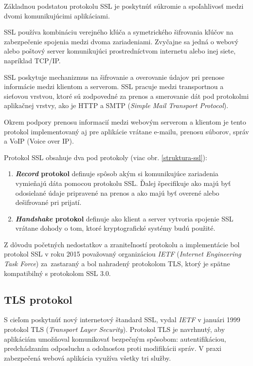 Základnou podstatou protokolu SSL je poskytnúť súkromie a spoľahlivosť medzi dvomi komunikujúcimi aplikáciami.

SSL používa kombináciu verejného kľúča a symetrického šifrovania kľúčov na zabezpečenie spojenia medzi dvoma zariadeniami. Zvyčajne sa jedná o webový alebo poštový server komunikujúci prostredníctvom internetu alebo inej siete, napríklad TCP/IP.

SSL poskytuje mechanizmus na šifrovanie a overovanie údajov pri prenose informácie medzi klientom a serverom. SSL pracuje medzi transportnou a sieťovou vrstvou, ktoré sú zodpovedné za prenos a smerovanie dát pod protokolmi aplikačnej vrstvy, ako je HTTP a SMTP (\emph{Simple Mail Transport Protocol}).

Okrem podpory prenosu informacií medzi webovým serverom a klientom je tento protokol implementovaný aj pre aplikácie vrátane e-mailu, prenosu súborov, správ a VoIP (Voice over IP).

Protokol SSL obsahuje dva pod protokoly (viac obr. \ref{struktura-ssl}):
\begin{enumerate}

\item \textbf{\emph{Record} protokol} definuje spôsob akým si komunikujúce zariadenia vymieňajú dáta pomocou protokolu SSL. Ďalej špecifikuje ako majú byť odosielané údaje pripravené na prenos a ako majú byť overené alebo dešifrované pri prijatí.

\item \textbf{\emph{Handshake} protokol} definuje ako klient a server vytvoria spojenie SSL vrátane dohody o tom, ktoré kryptografické systémy budú použité.

\end{enumerate}

Z dôvodu početných nedostatkov a zraniteľností protokolu a implementácie bol protokol SSL v roku 2015 považovaný organizáciou \emph{IETF} (\emph{Internet Engineering Task Force}) za~zastaraný a bol nahradený protokolom TLS, ktorý je spätne kompatibilný s protokolom SSL 3.0.

\subsection{TLS protokol}
S cieľom poskytnúť nový internetový štandard SSL, vydal \emph{IETF} v januári 1999 protokol TLS (\emph{Transport Layer Security}). Protokol TLS je navrhnutý, aby aplikáciám umožňoval komunikovať bezpečným spôsobom: autentifikáciou, predchádzaním odposluchu a odolnosťou proti modifikácii správ. V praxi zabezpečená webová aplikácia využíva všetky tri služby.

